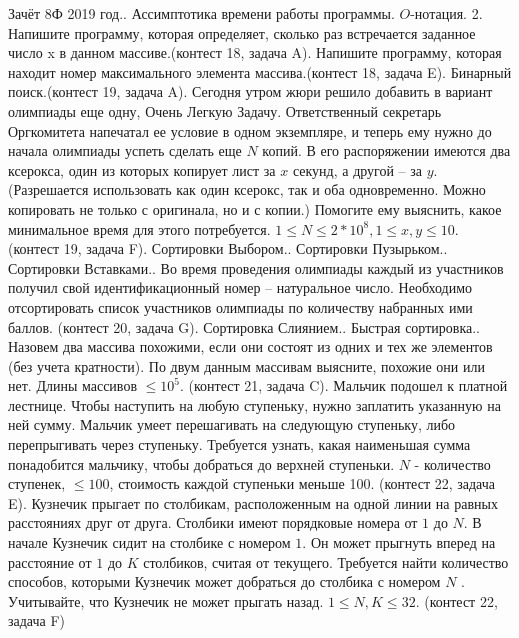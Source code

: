 \documentclass[a4paper,12pt]{article}
\begin{document}
Зачёт 8Ф 2019 год.. Ассимптотика времени работы программы. $O$-нотация.
2. Напишите программу, которая определяет, сколько раз встречается заданное число x в данном массиве.(контест 18, задача A). Напишите программу, которая находит номер максимального элемента массива.(контест 18, задача E). Бинарный поиск.(контест 19, задача A). Сегодня утром жюри решило добавить в вариант олимпиады еще одну, Очень Легкую Задачу. Ответственный секретарь Оргкомитета напечатал ее условие в одном экземпляре, и теперь ему нужно до начала олимпиады успеть сделать еще $N$ копий. В его распоряжении имеются два ксерокса, один из которых копирует лист за $x$ секунд, а другой – за $y$. (Разрешается использовать как один ксерокс, так и оба одновременно. Можно копировать не только с оригинала, но и с копии.) Помогите ему выяснить, какое минимальное время для этого потребуется. $1\le N\le 2*10^8, 1\le x, y \le 10$. (контест 19, задача F). Сортировки Выбором.. Сортировки Пузырьком.. Сортировки Вставками.. Во время проведения олимпиады каждый из участников получил свой идентификационный номер – натуральное число. Необходимо отсортировать список участников олимпиады по количеству набранных ими баллов. (контест 20, задача G). Сортировка Слиянием.. Быстрая сортировка.. Назовем два массива похожими, если они состоят из одних и тех же элементов (без учета кратности). По двум данным массивам выясните, похожие они или нет. Длины массивов $\le 10^5$. (контест 21, задача C). Мальчик подошел к платной лестнице. Чтобы наступить на любую ступеньку, нужно заплатить указанную на ней сумму. Мальчик умеет перешагивать на следующую ступеньку, либо перепрыгивать через ступеньку. Требуется узнать, какая наименьшая сумма понадобится мальчику, чтобы добраться до верхней ступеньки. $N$ - количество ступенек, $\le 100$, стоимость каждой ступеньки меньше 100. (контест 22, задача E). Кузнечик прыгает по столбикам, расположенным на одной линии на равных расстояниях друг от друга. Столбики имеют порядковые номера от $1$ до $N$. В начале Кузнечик сидит на столбике с номером $1$. Он может прыгнуть вперед на расстояние от $1$ до $K$ столбиков, считая от текущего. Требуется найти количество способов, которыми Кузнечик может добраться до столбика с номером $N$ . Учитывайте, что Кузнечик не может прыгать назад. $1 \le N, K \le 32$. (контест 22, задача F)\newline
\end{document}
